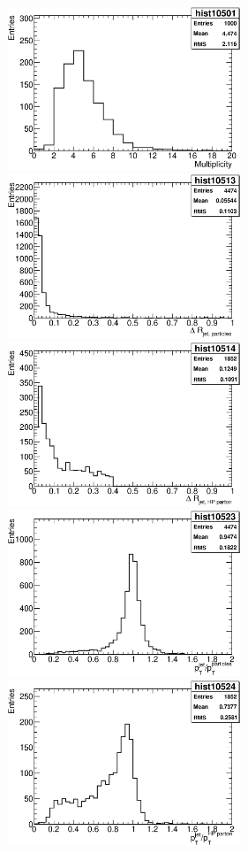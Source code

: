 \begin{Fighere}
\begin{center}
{
   \includegraphics[width=7.0cm,angle=0]{plot-multiJets.eps}\\
}
{
   \includegraphics[width=7.0cm,angle=0]{plot-dR-jetParticles.eps}
   \includegraphics[width=7.0cm,angle=0]{plot-dR-jetHPparton.eps}\\
}
{
   \includegraphics[width=7.0cm,angle=0]{plot-dPT-jetParticles.eps}
   \includegraphics[width=7.0cm,angle=0]{plot-dPT-jetHPparton.eps}
}
\end{center}
\end{Fighere}
